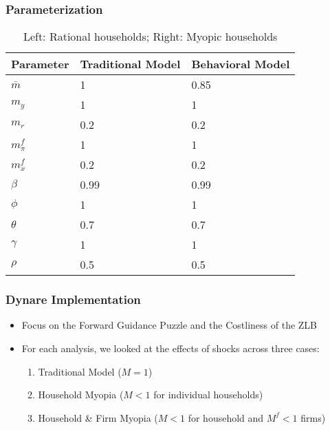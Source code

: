 \documentclass{beamer}
\begin{document}

\begin{frame}
	\frametitle{Parameterization}
\begin{table}
	\begin{tabular}{l l l}
		\toprule
		\textbf{Parameter} & \textbf{Traditional Model} & \textbf{Behavioral Model}\\
		\midrule
		$\bar{m}$ & 1 & 0.85 \\
		$m_{y}$ & 1 & 1 \\
		$m_{r}$ & 0.2 & 0.2\\
		$m^{f}_{\pi}$ & 1 & 1 \\
		$m^{f}_{x}$  & 0.2 & 0.2 \\
		\hline
		\hline
		$\beta$ & 0.99 & 0.99 \\
		$\phi$ & 1 & 1 \\
		$\theta$ & 0.7 & 0.7 \\
		$\gamma$ & 1 & 1 \\
		$\rho$	& 0.5 & 0.5\\
		\bottomrule
	\end{tabular}
	\caption{Left: Rational households; Right: Myopic households}
\end{table}
\end{frame}

\begin{frame}
	\frametitle{Dynare Implementation}
	\begin{itemize}
		\item Focus on the Forward Guidance Puzzle and the Costliness of the ZLB
		\vspace{8pt}
		\item For each analysis, we looked at the effects of shocks across three cases:
		\vspace{8pt}
		\begin{enumerate}
			\item Traditional Model ($M = 1$)
			\item Household Myopia ($M < 1$ for individual households)
			\item Household \& Firm Myopia ($M<1$ for household and $M^{f}<1$ firms)
		\end{enumerate}
	\end{itemize}
\end{frame}

\end{document}
